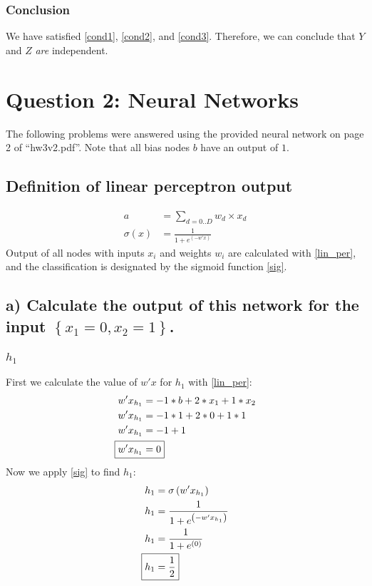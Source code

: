 \documentclass[12pt,letterpaper]{article}
\begin{document}
\subsubsection*{Conclusion}
We have satisfied \eqref{cond1}, \eqref{cond2}, and \eqref{cond3}. Therefore, we can conclude that $Y$ and $Z$ \emph{are} independent.
\section{Question 2: Neural Networks}
The following problems were answered using the provided neural network on page 2 of ``hw3v2.pdf''. Note that all bias nodes $b$ have an output of $1$.
\subsection*{Definition of linear perceptron output}
\begin{align}
\label{lin_per}
a &= \sum_{d=0..D}{w_d \times x_d}\\
\label{sig}
\sigma\left(x\right) &= \frac{1}{1+e^{\left(-w'x\right)}}
\end{align}
Output of all nodes with inputs $x_i$ and weights $w_i$ are calculated with \eqref{lin_per}, and the classification is designated by the sigmoid function \eqref{sig}.
\subsection{a) Calculate the output of this network for the input $\left\lbrace x_1=0,x_2=1\right\rbrace$.}
\subsubsection*{$h_1$}
First we calculate the value of $w'x$ for $h_1$ with \eqref{lin_per}:
\begin{align*}
w'x_{h_1} &= -1*b + 2*x_1 + 1*x_2\\
w'x_{h_1} &= -1*1 + 2*0 + 1*1\\
w'x_{h_1} &= -1+1\\
\Aboxed{w'x_{h_1} &= 0}
\end{align*}
Now we apply \eqref{sig} to find $h_1$:
\begin{align*}
h_1 &= \sigma\left(w'x_{h_1}\right)\\
h_1 &= \frac{1}{1+e^{\left(-w'x_{h_1}\right)}}\\
h_1 &= \frac{1}{1+e^{\left(0\right)}}\\
\Aboxed{h_1 &= \frac{1}{2}}
\end{align*}
\end{document}
